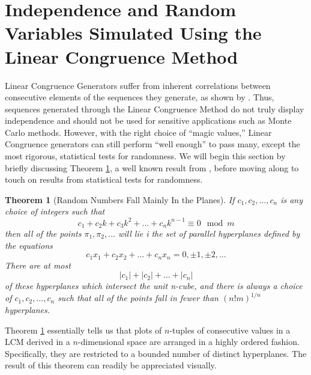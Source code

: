 \documentclass{article}
\theoremstyle{break}
\newtheorem{theorem}{Theorem}[section]
\begin{document}
\section{Independence and Random Variables Simulated Using the Linear Congruence Method}
Linear Congruence Generators suffer from inherent correlations between consecutive elements of the sequences they generate, as shown by  \autocite{marsaglia_random_1968}. Thus, sequences generated through the Linear Congruence Method do not truly display independence and should not be used for sensitive applications such as Monte Carlo methods. However, with the right choice of ``magic values,'' Linear Congruence generators can still perform ``well enough'' to pass many, except the most rigorous, statistical tests for randomness. We will begin this section by briefly discussing Theorem \ref{thm:main_in_plane}, a well known result from  \autocite{marsaglia_random_1968}, before moving along to touch on results from statistical tests for randomness.
\begin{theorem}[Random Numbers Fall Mainly In the Planes] \label{thm:main_in_plane}
If $c_1,c_2,...,c_n$ is any choice of integers such that
\[ 
c_1 + c_2k + c_3k^2 + ... + c_n k^{n-1} \equiv 0 \mod m
\]
then all of the points $\pi_1,\pi_2,...$ will lie i the set of parallel hyperplanes defined by the equations
\[
c_1x_1 + c_2x_2 + ... + c_nx_n = 0, \pm 1, \pm 2, ...
\]
There are at most
\[
|c_1| + |c_2| + ... + |c_n|
\]
of these hyperplanes which intersect the unit n-cube, and there is always a choice of $c_1,c_2,...,c_n$ such that all of the points fall in fewer than $(n!m)^{1/n}$ hyperplanes.
\end{theorem}
Theorem \ref{thm:main_in_plane} essentially tells us that plots of $n$-tuples of consecutive values in a LCM derived in a $n$-dimensional space are arranged in a highly ordered fashion. Specifically, they are restricted to a bounded number of distinct hyperplanes. The result of this theorem can readily be appreciated visually.
\end{document}
